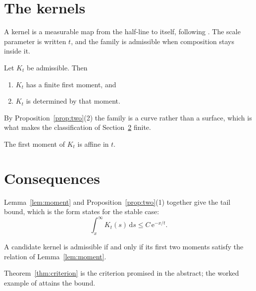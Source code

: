 \section{The kernels}
\label{sec:kernels}

A kernel is a measurable map from the half-line to itself, following
\cite{author2020kernels}. The scale parameter is written $t$, and the family is
admissible when composition stays inside it.

\begin{proposition}
  \label{prop:two}
  Let $K_t$ be admissible. Then
  \begin{enumerate}
    \item $K_t$ has a finite first moment, and
    \item $K_t$ is determined by that moment.
  \end{enumerate}
\end{proposition}

By Proposition~\ref{prop:two}(2) the family is a curve rather than a surface, which is
what makes the classification of Section~\ref{sec:consequences} finite.

\begin{lemma}
  \label{lem:moment}
  The first moment of $K_t$ is affine in $t$.
\end{lemma}

\section{Consequences}
\label{sec:consequences}

Lemma~\ref{lem:moment} and Proposition~\ref{prop:two}(1) together give the tail bound,
which is the form \cite{writer2019tails} states for the stable case:
\begin{equation}
  \int_x^\infty K_t(s)\,\mathrm{d}s \le C\,\mathrm{e}^{-x/t}.
  \tag{2.1}
\end{equation}

\begin{theorem}
  \label{thm:criterion}
  A candidate kernel is admissible if and only if its first two moments satisfy the
  relation of Lemma~\ref{lem:moment}.
\end{theorem}

Theorem~\ref{thm:criterion} is the criterion promised in the abstract; the worked
example of \cite{author2020kernels} attains the bound.
